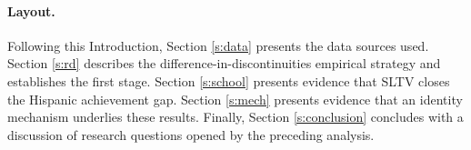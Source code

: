 \documentclass[11pt]{article}
\begin{document}
 









\paragraph{Layout.} Following this Introduction, Section \ref{s:data} presents the data sources used. Section \ref{s:rd} describes the difference-in-discontinuities empirical strategy and establishes the first stage. Section \ref{s:school} presents evidence that SLTV closes the Hispanic achievement gap. Section \ref{s:mech} presents evidence that an identity mechanism underlies these results. Finally, Section \ref{s:conclusion} concludes with a discussion of research questions opened by the preceding analysis.
\end{document}
